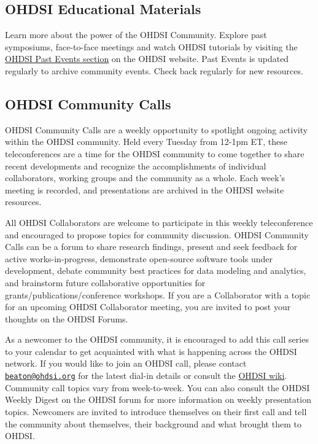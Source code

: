 \documentclass[11pt]{book}
\theoremstyle{definition}
\theoremstyle{definition}
\theoremstyle{definition}
\theoremstyle{remark}
\begin{document}
\hypertarget{ohdsi-educational-materials}{%
\subsection{OHDSI Educational Materials}\label{ohdsi-educational-materials}}

Learn more about the power of the OHDSI Community. Explore past symposiums, face-to-face meetings and watch OHDSI tutorials by visiting the \href{https://www.ohdsi.org/past-events/}{OHDSI Past Events section} on the OHDSI website. Past Events is updated regularly to archive community events. Check back regularly for new resources.

\hypertarget{ohdsi-community-calls}{%
\subsection{OHDSI Community Calls}\label{ohdsi-community-calls}}

OHDSI Community Calls are a weekly opportunity to spotlight ongoing activity within the OHDSI community. Held every Tuesday from 12-1pm ET, these teleconferences are a time for the OHDSI community to come together to share recent developments and recognize the accomplishments of individual collaborators, working groups and the community as a whole. Each week's meeting is recorded, and presentations are archived in the OHDSI website resources.

All OHDSI Collaborators are welcome to participate in this weekly teleconference and encouraged to propose topics for community discussion. OHDSI Community Calls can be a forum to share research findings, present and seek feedback for active works-in-progress, demonstrate open-source software tools under development, debate community best practices for data modeling and analytics, and brainstorm future collaborative opportunities for grants/publications/conference workshops. If you are a Collaborator with a topic for an upcoming OHDSI Collaborator meeting, you are invited to post your thoughts on the OHDSI Forums.

As a newcomer to the OHDSI community, it is encouraged to add this call series to your calendar to get acquainted with what is happening across the OHDSI network. If you would like to join an OHDSI call, please contact \href{mailto:beaton@ohdsi.org}{\nolinkurl{beaton@ohdsi.org}} for the latest dial-in details or consult the \href{https://www.ohdsi.org/web/wiki/doku.php?id=projects:ohdsi_community}{OHDSI wiki}. Community call topics vary from week-to-week. You can also consult the OHDSI Weekly Digest on the OHDSI forum for more information on weekly presentation topics. Newcomers are invited to introduce themselves on their first call and tell the community about themselves, their background and what brought them to OHDSI. 
\end{document}
